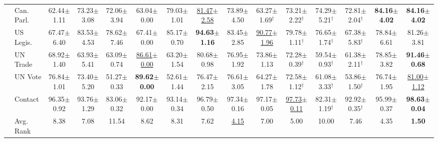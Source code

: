 \begin{table}[t]
{\begin{tabular}{llccccccccccccc}
 & Can. Parl. & 62.44{\scriptsize$\pm$1.11} & 73.23{\scriptsize$\pm$3.08} & 72.06{\scriptsize$\pm$3.94} & 63.04{\scriptsize$\pm$0.00} & 79.03{\scriptsize$\pm$1.01} & \underline{81.47{\scriptsize$\pm$2.58}} & 73.89{\scriptsize$\pm$4.50} & 63.27{\scriptsize$\pm$1.69}$^\dagger$ & 73.21{\scriptsize$\pm$2.22}$^\dagger$ & 74.29{\scriptsize$\pm$5.21}$^\dagger$ & 72.81{\scriptsize$\pm$2.04}$^\dagger$ & \textbf{84.16{\scriptsize$\pm$4.02}} & \textbf{84.16{\scriptsize$\pm$4.02}} \\
 & US Legis. & 67.47{\scriptsize$\pm$6.40} & 83.53{\scriptsize$\pm$4.53} & 78.62{\scriptsize$\pm$7.46} & 67.41{\scriptsize$\pm$0.00} & 85.17{\scriptsize$\pm$0.70} & \textbf{94.63{\scriptsize$\pm$1.16}} & 83.45{\scriptsize$\pm$2.85} & \underline{90.77{\scriptsize$\pm$1.96}} & 79.78{\scriptsize$\pm$1.11}$^\dagger$ & 76.65{\scriptsize$\pm$1.74}$^\dagger$ & 67.38{\scriptsize$\pm$5.83}$^\dagger$ & 78.84{\scriptsize$\pm$6.61} & 81.26{\scriptsize$\pm$3.81} \\
 & UN Trade & 68.92{\scriptsize$\pm$1.40} & 63.93{\scriptsize$\pm$5.41} & 63.09{\scriptsize$\pm$0.74} & \underline{86.61{\scriptsize$\pm$0.00}} & 63.20{\scriptsize$\pm$1.54} & 80.68{\scriptsize$\pm$0.98} & 76.95{\scriptsize$\pm$1.92} & 73.86{\scriptsize$\pm$1.13} & 72.28{\scriptsize$\pm$0.39}$^\dagger$ & 59.54{\scriptsize$\pm$0.93}$^\dagger$ & 61.38{\scriptsize$\pm$2.11}$^\dagger$ & 78.85{\scriptsize$\pm$3.82} & \textbf{91.46{\scriptsize$\pm$0.68}} \\
 & UN Vote & 76.84{\scriptsize$\pm$1.01} & 73.40{\scriptsize$\pm$5.20} & 51.27{\scriptsize$\pm$0.33} & \textbf{89.62{\scriptsize$\pm$0.00}} & 52.61{\scriptsize$\pm$1.44} & 76.47{\scriptsize$\pm$2.15} & 76.61{\scriptsize$\pm$3.05} & 64.27{\scriptsize$\pm$1.78} & 72.58{\scriptsize$\pm$1.12}$^\dagger$ & 61.08{\scriptsize$\pm$3.33}$^\dagger$ & 53.86{\scriptsize$\pm$1.50}$^\dagger$ & 76.74{\scriptsize$\pm$1.95} & \underline{81.00{\scriptsize$\pm$1.12}} \\
 & Contact & 96.35{\scriptsize$\pm$0.92} & 93.76{\scriptsize$\pm$1.29} & 83.06{\scriptsize$\pm$0.32} & 92.17{\scriptsize$\pm$0.00} & 93.14{\scriptsize$\pm$0.34} & 96.79{\scriptsize$\pm$0.50} & 97.34{\scriptsize$\pm$0.16} & 97.17{\scriptsize$\pm$0.05} & \underline{97.73{\scriptsize$\pm$0.11}} & 82.31{\scriptsize$\pm$1.19}$^\dagger$ & 92.92{\scriptsize$\pm$0.35}$^\dagger$ & 95.99{\scriptsize$\pm$0.37} & \textbf{98.63{\scriptsize$\pm$0.04}} \\
\cmidrule{2-15}
 & Avg. Rank & 8.38 & 7.08 & 11.54 & 8.62 & 8.31 & 7.62 & \underline{4.15} & 7.00 & 5.00 & 10.00 & 7.46 & 4.35 & \textbf{1.50} \\

\end{tabular}}
\end{table}
